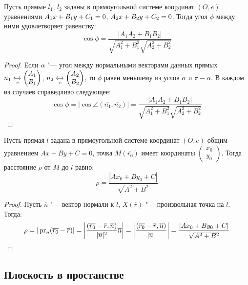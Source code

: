 \begin{proposition}
	Пусть прямые $l_1$, $l_2$ заданы в прямоугольной системе координат $(O, e)$ уравнениями $A_1x\hm{+}B_1y+C_1=0$, $A_2x\hm{+}B_2y\hm{+}C_2=0$. Тогда угол $\phi$ между ними удовлетворяет равенству:
	\[\cos{\phi} = \frac{|A_1A_2+B_1B_2|}{\sqrt{A_1^2+B_1^2}\sqrt{A_2^2+B_2^2}}\]
\end{proposition}

\begin{proof}
	Если $\alpha$ "--- угол между нормальными векторами данных прямых $\overline{n_1} \xleftrightarrow[e]{} \begin{pmatrix}A_1\\B_1\end{pmatrix}$, $\overline{n_2} \xleftrightarrow[e]{} \begin{pmatrix}A_2\\B_2\end{pmatrix}$, то $\phi$ равен меньшему из углов $\alpha$ и $\pi - \alpha$. В каждом из случаев справедливо следующее:
	\[\cos{\phi} = |\cos{\angle(\overline{n_1}, \overline{n_2})}| = \frac{|A_1A_2+B_1B_2|}{\sqrt{A_1^2+B_1^2}\sqrt{A_2^2+B_2^2}}\]
\end{proof}

\begin{proposition}
	Пусть прямая $l$ задана в прямоугольной системе координат $(O, e)$ общим уравнением $Ax+By+C=0$, точка $M(\overline{r_0})$ имеет координаты $\begin{pmatrix}x_0\\y_0\end{pmatrix}$. Тогда расстояние $\rho$ от $M$ до $l$ равно:
	\[\rho = \frac{|Ax_0 + By_0 + C|}{\sqrt{A^2 + B^2}}\]
\end{proposition}

\begin{proof}
	Пусть $\overline{n}$ "--- вектор нормали к $l$, $X(\overline{r})$ "--- произвольная точка на $l$. Тогда:
	\[\rho = |\operatorname{pr}_{\overline{n}}(\overline{r_0} - \overline{r})| = \left|\frac{(\overline{r_0} - \overline{r}, \overline{n})}{|\overline{n}|^2}\overline{n}\right| = \left|\frac{(\overline{r_0} - \overline{r}, \overline{n})}{|\overline{n}|}\right| = \frac{|Ax_0 + By_0 + C|}{\sqrt{A^2 + B^2}}\]
\end{proof}

\subsection{Плоскость в простанстве}

